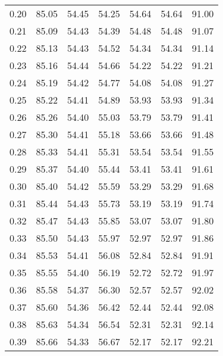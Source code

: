 \begin{tabular}{|c|c|c|c|c|c|c|}
      0.20 &     85.05 &     54.45 &      54.25 &   54.64 &      54.64 &         91.00 \\
      0.21 &     85.09 &     54.43 &      54.39 &   54.48 &      54.48 &         91.07 \\
      0.22 &     85.13 &     54.43 &      54.52 &   54.34 &      54.34 &         91.14 \\
      0.23 &     85.16 &     54.44 &      54.66 &   54.22 &      54.22 &         91.21 \\
      0.24 &     85.19 &     54.42 &      54.77 &   54.08 &      54.08 &         91.27 \\
      0.25 &     85.22 &     54.41 &      54.89 &   53.93 &      53.93 &         91.34 \\
      0.26 &     85.26 &     54.40 &      55.03 &   53.79 &      53.79 &         91.41 \\
      0.27 &     85.30 &     54.41 &      55.18 &   53.66 &      53.66 &         91.48 \\
      0.28 &     85.33 &     54.41 &      55.31 &   53.54 &      53.54 &         91.55 \\
      0.29 &     85.37 &     54.40 &      55.44 &   53.41 &      53.41 &         91.61 \\
      0.30 &     85.40 &     54.42 &      55.59 &   53.29 &      53.29 &         91.68 \\
      0.31 &     85.44 &     54.43 &      55.73 &   53.19 &      53.19 &         91.74 \\
      0.32 &     85.47 &     54.43 &      55.85 &   53.07 &      53.07 &         91.80 \\
      0.33 &     85.50 &     54.43 &      55.97 &   52.97 &      52.97 &         91.86 \\
      0.34 &     85.53 &     54.41 &      56.08 &   52.84 &      52.84 &         91.91 \\
      0.35 &     85.55 &     54.40 &      56.19 &   52.72 &      52.72 &         91.97 \\
      0.36 &     85.58 &     54.37 &      56.30 &   52.57 &      52.57 &         92.02 \\
      0.37 &     85.60 &     54.36 &      56.42 &   52.44 &      52.44 &         92.08 \\
      0.38 &     85.63 &     54.34 &      56.54 &   52.31 &      52.31 &         92.14 \\
      0.39 &     85.66 &     54.33 &      56.67 &   52.17 &      52.17 &         92.21 \\

\end{tabular}
